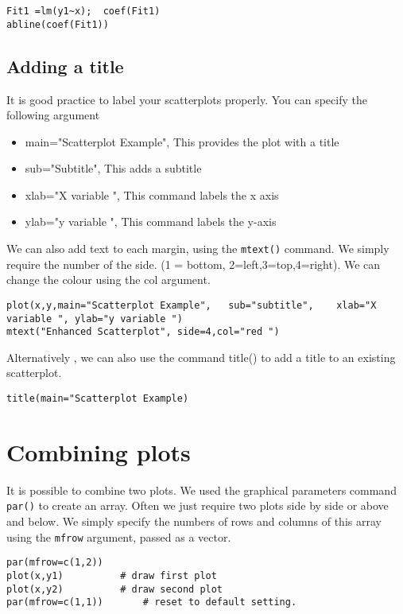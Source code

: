 \documentclass[a4paper,12pt]{article}
\begin{document}
\begin{itemize}
\begin{itemize}
\footnotesize \begin{verbatim}
Fit1 =lm(y1~x);  coef(Fit1)
abline(coef(Fit1))	
\end{verbatim}\normalsize

\subsection{Adding a title }

It is good practice to label your scatterplots properly. You can specify the following argument
\begin{itemize}
\item	main="Scatterplot Example", 	This provides the plot with a title
\item	sub="Subtitle",                 This adds a subtitle
\item	xlab="X variable ",				This command labels the x axis 
\item   ylab="y variable ",				This command labels the y-axis
\end{itemize}
We can also add text to each margin, using the \texttt{mtext()} command.  
We simply require the number of the side. (1 = bottom, 2=left,3=top,4=right). 
We can change the colour using the col argument.
\footnotesize \begin{verbatim}
plot(x,y,main="Scatterplot Example",   sub="subtitle",    xlab="X variable ", ylab="y variable ")	
mtext("Enhanced Scatterplot", side=4,col="red ")
\end{verbatim}\normalsize
Alternatively , we can also use the command title() to add a title to an existing scatterplot.
\footnotesize \begin{verbatim}
title(main="Scatterplot Example)	
\end{verbatim}\normalsize


\section{Combining plots}
It is possible to combine two plots. We used the graphical parameters command \texttt{par()} to create an array. 
Often we just require two plots side by side or above and below. We simply specify the numbers of rows and columns of this array using the \texttt{mfrow} argument, passed as a vector.

\begin{verbatim}
par(mfrow=c(1,2))
plot(x,y1)			# draw first plot
plot(x,y2)			# draw second plot
par(mfrow=c(1,1))		# reset to default setting.
\end{verbatim}


\end{itemize}
\end{itemize}
\end{document}
